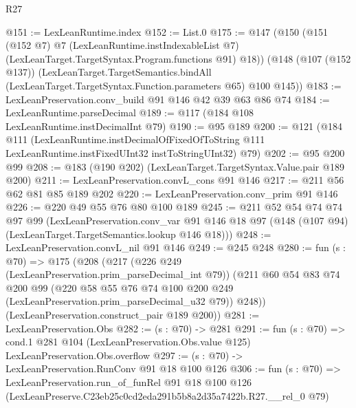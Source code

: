 \begin{lexlean}{R27}
\begin{coremodule}
@151 := LexLeanRuntime.index
@152 := List.{0}
@175 := @147
    (@150
      (@151
        (@152 @7)
        @7
        (LexLeanRuntime.instIndexableList @7)
        (LexLeanTarget.TargetSyntax.Program.functions @91)
        @18))
    (@148
      (@107 (@152 @137))
      (LexLeanTarget.TargetSemantics.bindAll
        (LexLeanTarget.TargetSyntax.Function.parameters @65)
        @100
        @145))
@183 := LexLeanPreservation.conv_build @91 @146 @42 @39 @63 @86 @74
@184 := LexLeanRuntime.parseDecimal
@189 := @117 (@184 @108 LexLeanRuntime.instDecimalInt @79)
@190 := @95 @189
@200 := @121
    (@184
      @111
      (LexLeanRuntime.instDecimalOfFixedOfToString
        @111
        LexLeanRuntime.instFixedUInt32
        instToStringUInt32)
      @79)
@202 := @95 @200 @99
@208 := @183 (@190 @202) (LexLeanTarget.TargetSyntax.Value.pair @189 @200)
@211 := LexLeanPreservation.convL_cons @91 @146
@217 := @211 @56 @62 @81 @85 @189 @202
@220 := LexLeanPreservation.conv_prim @91 @146
@226 := @220 @49 @55 @76 @80 @100 @189
@245 := @211
    @52
    @54
    @74
    @74
    @97
    @99
    (LexLeanPreservation.conv_var
      @91
      @146
      @18
      @97
      (@148 (@107 @94) (LexLeanTarget.TargetSemantics.lookup @146 @18)))
@248 := LexLeanPreservation.convL_nil @91 @146
@249 := @245 @248
@280 := fun (s : @70) =>
  @175
    (@208
      (@217
        (@226 @249 (LexLeanPreservation.prim_parseDecimal_int @79))
        (@211
          @60
          @54
          @83
          @74
          @200
          @99
          (@220 @58 @55 @76 @74 @100 @200 @249 (LexLeanPreservation.prim_parseDecimal_u32 @79))
          @248))
      (LexLeanPreservation.construct_pair @189 @200))
@281 := LexLeanPreservation.Obs
@282 := (s : @70) -> @281
@291 := fun (s : @70) =>
  cond.{1} @281 @104 (LexLeanPreservation.Obs.value @125) LexLeanPreservation.Obs.overflow
@297 := (s : @70) -> LexLeanPreservation.RunConv @91 @18 @100 @126
@306 := fun (s : @70) =>
  LexLeanPreservation.run_of_funRel
    @91
    @18
    @100
    @126
    (LexLeanPreserve.C23eb25c0cd2eda291b5b8a2d35a7422b.R27.__rel_0 @79)
\end{coremodule}
\end{lexlean}
